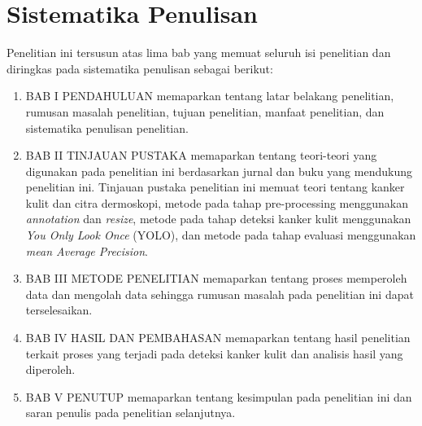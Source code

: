     \section{Sistematika Penulisan}
    Penelitian ini tersusun atas lima bab yang memuat seluruh isi penelitian dan diringkas pada sistematika penulisan sebagai berikut:
    \begin{enumerate}
        \item BAB I PENDAHULUAN
        memaparkan tentang latar belakang penelitian, rumusan masalah penelitian, tujuan penelitian, manfaat penelitian, dan sistematika penulisan penelitian.
        \item BAB II TINJAUAN PUSTAKA
        memaparkan tentang teori-teori yang digunakan pada penelitian ini berdasarkan jurnal dan buku yang mendukung penelitian ini. Tinjauan pustaka penelitian ini memuat teori tentang kanker kulit dan citra dermoskopi, metode pada tahap pre-processing menggunakan \textit{annotation} dan \textit{resize}, metode pada tahap deteksi kanker kulit menggunakan \textit{You Only Look Once} (YOLO), dan metode pada tahap evaluasi menggunakan \textit{mean Average Precision}.
        \item BAB III METODE PENELITIAN 
        memaparkan tentang proses memperoleh data dan mengolah data sehingga rumusan masalah pada penelitian ini dapat terselesaikan.
        \item BAB IV HASIL DAN PEMBAHASAN
        memaparkan tentang hasil penelitian terkait proses yang terjadi pada deteksi kanker kulit dan analisis hasil yang diperoleh.
        \item BAB V PENUTUP
        memaparkan tentang kesimpulan pada penelitian ini dan saran penulis pada penelitian selanjutnya.
    \end{enumerate}